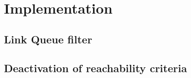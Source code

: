 \section{Implementation}

\subsection{Link Queue filter}
\subsection{Deactivation of reachability criteria}

